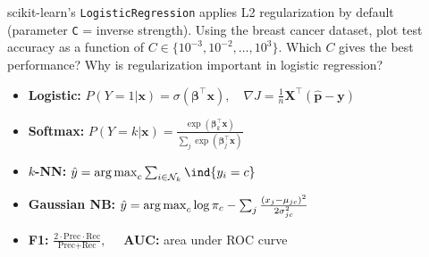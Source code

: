 \begin{exercise}
scikit-learn's \texttt{LogisticRegression} applies L2 regularization by default (parameter \texttt{C} = inverse strength). Using the breast cancer dataset, plot test accuracy as a function of $C \in \{10^{-3}, 10^{-2}, \ldots, 10^{3}\}$. Which $C$ gives the best performance? Why is regularization important in logistic regression?
\end{exercise}

\begin{keyformulas}[title=\textbf{Chapter 3 Summary}]
\begin{itemize}
    \item \textbf{Logistic:} $P(Y\!=\!1|\bm{x}) = \sigma(\bm{\beta}^\top\bm{x}),\quad \nabla J = \frac{1}{n}\bm{X}^\top(\hat{\bm{p}}-\bm{y})$
    \item \textbf{Softmax:} $P(Y\!=\!k|\bm{x}) = \frac{\exp(\bm{\beta}_k^\top\bm{x})}{\sum_j \exp(\bm{\beta}_j^\top\bm{x})}$
    \item \textbf{$k$-NN:} $\hat{y} = \argmax_c \sum_{i \in \mathcal{N}_k} \ind\{y_i=c\}$
    \item \textbf{Gaussian NB:} $\hat{y} = \operatorname*{arg\,max}_c \log\pi_c - \sum_j \frac{(x_j-\mu_{jc})^2}{2\sigma_{jc}^2}$
    \item \textbf{F1:} $\frac{2\cdot\text{Prec}\cdot\text{Rec}}{\text{Prec}+\text{Rec}},\quad$ \textbf{AUC:} area under ROC curve
\end{itemize}
\end{keyformulas}
